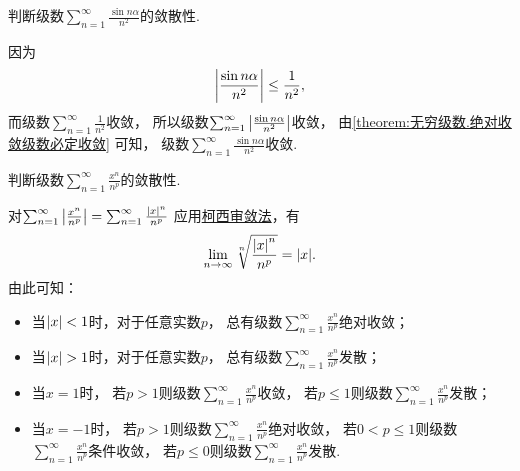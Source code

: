 \begin{example}
判断级数\(\sum_{n=1}^\infty \frac{\sin n\alpha}{n^2}\)的敛散性.
\begin{solution}
因为\begin{equation*}
	\abs{\frac{\sin n\alpha}{n^2}}
	\leq \frac1{n^2},
\end{equation*}
而级数\(\sum_{n=1}^\infty \frac1{n^2}\)收敛，
所以级数\(\sum_{n=1}^\infty \abs{\frac{\sin n\alpha}{n^2}}\)收敛，
由\cref{theorem:无穷级数.绝对收敛级数必定收敛} 可知，
级数\(\sum_{n=1}^\infty \frac{\sin n\alpha}{n^2}\)收敛.
\end{solution}
\end{example}

\begin{example}
判断级数\(\sum_{n=1}^\infty \frac{x^n}{n^p}\)的敛散性.
\begin{solution}
对\(\sum_{n=1}^\infty \abs{\frac{x^n}{n^p}}
= \sum_{n=1}^\infty \frac{\abs{x}^n}{n^p}\)
应用\hyperref[theorem:无穷级数.正项级数的根值审敛法]{柯西审敛法}，有\begin{equation*}
	\lim_{n\to\infty} \sqrt[n]{\frac{\abs{x}^n}{n^p}}
	= \abs{x}.
\end{equation*}
由此可知：\begin{itemize}
	\item 当\(\abs{x}<1\)时，对于任意实数\(p\)，
	总有级数\(\sum_{n=1}^\infty \frac{x^n}{n^p}\)绝对收敛；

	\item 当\(\abs{x}>1\)时，对于任意实数\(p\)，
	总有级数\(\sum_{n=1}^\infty \frac{x^n}{n^p}\)发散；

	\item 当\(x=1\)时，
	若\(p>1\)则级数\(\sum_{n=1}^\infty \frac{x^n}{n^p}\)收敛，
	若\(p\leq1\)则级数\(\sum_{n=1}^\infty \frac{x^n}{n^p}\)发散；

	\item 当\(x=-1\)时，
	若\(p>1\)则级数\(\sum_{n=1}^\infty \frac{x^n}{n^p}\)绝对收敛，
	若\(0<p\leq1\)则级数\(\sum_{n=1}^\infty \frac{x^n}{n^p}\)条件收敛，
	若\(p\leq0\)则级数\(\sum_{n=1}^\infty \frac{x^n}{n^p}\)发散.
\end{itemize}
\end{solution}
\end{example}

